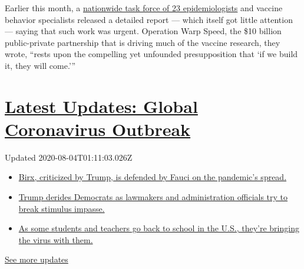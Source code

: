 Earlier this month, a
\href{https://www.centerforhealthsecurity.org/our-work/pubs_archive/pubs-pdfs/2020/200709-The-Publics-Role-in-COVID-19-Vaccination.pdf}{nationwide
task force of 23 epidemiologists} and vaccine behavior specialists
released a detailed report --- which itself got little attention ---
saying that such work was urgent. Operation Warp Speed, the \$10 billion
public-private partnership that is driving much of the vaccine research,
they wrote, ``rests upon the compelling yet unfounded presupposition
that `if we build it, they will come.'''

\hypertarget{latest-updates-global-coronavirus-outbreak}{%
\section{\texorpdfstring{\href{https://www.nytimes.com/2020/08/03/world/coronavirus-covid-19.html?action=click\&pgtype=Article\&state=default\&region=MAIN_CONTENT_1\&context=storylines_live_updates}{Latest
Updates: Global Coronavirus
Outbreak}}{Latest Updates: Global Coronavirus Outbreak}}\label{latest-updates-global-coronavirus-outbreak}}

Updated 2020-08-04T01:11:03.026Z

\begin{itemize}
\tightlist
\item
  \href{https://www.nytimes.com/2020/08/03/world/coronavirus-covid-19.html?action=click\&pgtype=Article\&state=default\&region=MAIN_CONTENT_1\&context=storylines_live_updates\#link-4e40df05}{Birx,
  criticized by Trump, is defended by Fauci on the pandemic's spread.}
\item
  \href{https://www.nytimes.com/2020/08/03/world/coronavirus-covid-19.html?action=click\&pgtype=Article\&state=default\&region=MAIN_CONTENT_1\&context=storylines_live_updates\#link-15e7f995}{Trump
  derides Democrats as lawmakers and administration officials try to
  break stimulus impasse.}
\item
  \href{https://www.nytimes.com/2020/08/03/world/coronavirus-covid-19.html?action=click\&pgtype=Article\&state=default\&region=MAIN_CONTENT_1\&context=storylines_live_updates\#link-4c85ed64}{As
  some students and teachers go back to school in the U.S., they're
  bringing the virus with them.}
\end{itemize}

\href{https://www.nytimes.com/2020/08/03/world/coronavirus-covid-19.html?action=click\&pgtype=Article\&state=default\&region=MAIN_CONTENT_1\&context=storylines_live_updates}{See
more updates}

